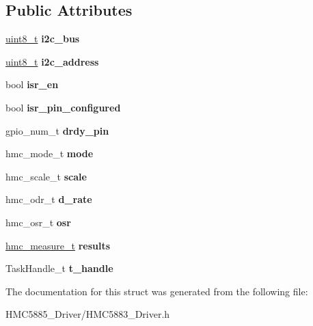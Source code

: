 \subsection*{Public Attributes}
\begin{DoxyCompactItemize}
\item 
\mbox{\label{structHMC5883__Driver_a7e3b92c0b42e7121d70ef760c279beea}} 
\hyperlink{vl53l0x__types_8h_aba7bc1797add20fe3efdf37ced1182c5}{uint8\+\_\+t} {\bfseries i2c\+\_\+bus}
\item 
\mbox{\label{structHMC5883__Driver_aaf3b6257f1a9727ef32d9372e39a719c}} 
\hyperlink{vl53l0x__types_8h_aba7bc1797add20fe3efdf37ced1182c5}{uint8\+\_\+t} {\bfseries i2c\+\_\+address}
\item 
\mbox{\label{structHMC5883__Driver_a2e8b3a8f9880e7ac56837c2cd35c80d9}} 
bool {\bfseries isr\+\_\+en}
\item 
\mbox{\label{structHMC5883__Driver_abc042870c5e7657aefb3cb3193618624}} 
bool {\bfseries isr\+\_\+pin\+\_\+configured}
\item 
\mbox{\label{structHMC5883__Driver_a59f50a7e408988ed36204ca1767962db}} 
gpio\+\_\+num\+\_\+t {\bfseries drdy\+\_\+pin}
\item 
\mbox{\label{structHMC5883__Driver_a79f78a6b7d768992b5052671527c8053}} 
hmc\+\_\+mode\+\_\+t {\bfseries mode}
\item 
\mbox{\label{structHMC5883__Driver_a0d3b1d900f0a593095fa1f5096b6736b}} 
hmc\+\_\+scale\+\_\+t {\bfseries scale}
\item 
\mbox{\label{structHMC5883__Driver_a9a1d32ee6489c6f49ee00b56050e8e4e}} 
hmc\+\_\+odr\+\_\+t {\bfseries d\+\_\+rate}
\item 
\mbox{\label{structHMC5883__Driver_ae40e034b2260581e33fa590e3fd7afe1}} 
hmc\+\_\+osr\+\_\+t {\bfseries osr}
\item 
\mbox{\label{structHMC5883__Driver_a1134efbfe0ef26f01546dc7060de7440}} 
\hyperlink{structHMC__Measurements}{hmc\+\_\+measure\+\_\+t} {\bfseries results}
\item 
\mbox{\label{structHMC5883__Driver_a3a69557b10567d5de073146c9293578b}} 
Task\+Handle\+\_\+t {\bfseries t\+\_\+handle}
\end{DoxyCompactItemize}


The documentation for this struct was generated from the following file\+:\begin{DoxyCompactItemize}
\item 
H\+M\+C5885\+\_\+\+Driver/H\+M\+C5883\+\_\+\+Driver.\+h\end{DoxyCompactItemize}
